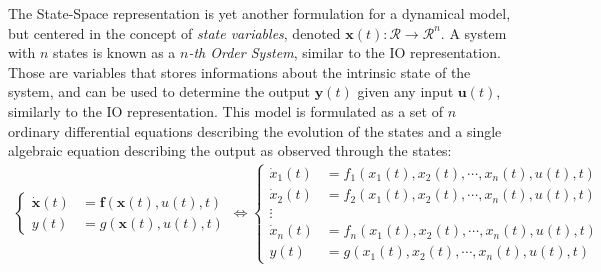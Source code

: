 \documentclass[a4paper,11pt]{book}
\numberwithin{figure}{chapter}
\numberwithin{equation}{chapter}
\numberwithin{table}{chapter}
\theoremstyle{definition}
\begin{document}
The State-Space representation is yet another formulation for a dynamical model, but centered in the concept of \textit{state variables}, denoted $\mathbf{x}(t) : \mathcal{R} \rightarrow \mathcal{R}^n$. A system with $n$ states is known as a \textit{$n$-th Order System}, similar to the IO representation. Those are variables that stores informations about the intrinsic state of the system, and can be used to determine the output $\mathbf{y}(t)$ given any input $\mathbf{u}(t)$, similarly to the IO representation. This model is formulated as a set of $n$ ordinary differential equations describing the evolution of the states and a single algebraic equation describing the output as observed through the states: 
\begin{align} \label{eq:SSRepr01}
\begin{cases}
	\dot{\mathbf{x}}(t) &= \bm{f}(\bm{x}(t), u(t), t) \\
	y(t) &= g(\bm{x}(t), u(t), t) 	
\end{cases} \Leftrightarrow \begin{cases}
	\dot{x}_1(t) &= f_1(x_1(t), x_2(t), \cdots, x_n(t), u(t), t) \\
	\dot{x}_2(t) &= f_2(x_1(t), x_2(t), \cdots, x_n(t), u(t), t) \\
	 \vdots \\
	\dot{x}_n(t) &= f_n(x_1(t), x_2(t), \cdots, x_n(t), u(t), t) \\
	y(t) &= g(x_1(t), x_2(t), \cdots, x_n(t), u(t), t) 
\end{cases}
\end{align}
\end{document}
